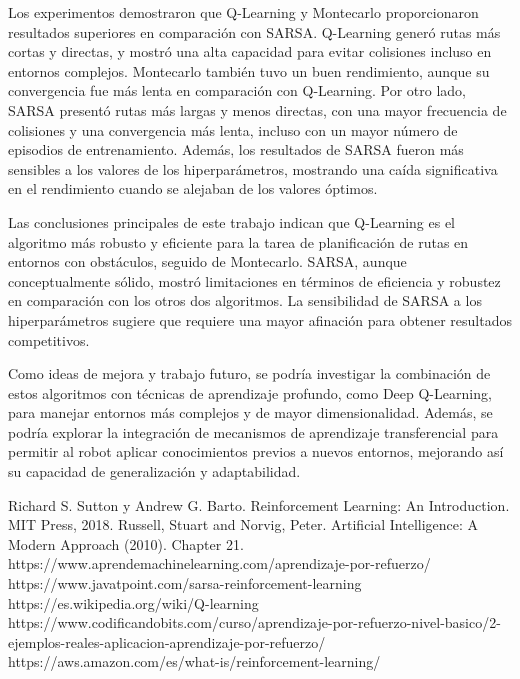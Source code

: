 \documentclass[conference,a4paper]{IEEEtran}
\begin{document}
Los experimentos demostraron que Q-Learning y Montecarlo proporcionaron resultados superiores en comparación con SARSA. Q-Learning generó rutas más cortas y directas, y mostró una alta 
capacidad para evitar colisiones incluso en entornos complejos. Montecarlo también tuvo un buen rendimiento, aunque su convergencia fue más lenta en comparación con Q-Learning. Por otro lado,
SARSA presentó rutas más largas y menos directas, con una mayor frecuencia de colisiones y una convergencia más lenta, incluso con un mayor número de episodios de entrenamiento.
Además, los resultados de SARSA fueron más sensibles a los valores de los hiperparámetros, mostrando una caída significativa en el rendimiento cuando se alejaban de los valores óptimos.\newline

Las conclusiones principales de este trabajo indican que Q-Learning es el algoritmo más robusto y eficiente para la tarea de planificación de rutas en entornos con obstáculos, seguido de Montecarlo. 
SARSA, aunque conceptualmente sólido, mostró limitaciones en términos de eficiencia y robustez en comparación con los otros dos algoritmos. La sensibilidad de SARSA a los hiperparámetros sugiere que 
requiere una mayor afinación para obtener resultados competitivos.\newline

Como ideas de mejora y trabajo futuro, se podría investigar la combinación de estos algoritmos con técnicas de aprendizaje profundo, como Deep Q-Learning, para manejar entornos más complejos y
de mayor dimensionalidad. Además, se podría explorar la integración de mecanismos de aprendizaje transferencial para permitir al robot aplicar conocimientos previos a nuevos entornos, mejorando
así su capacidad de generalización y adaptabilidad.

  \begin{thebibliography}{99}
   Richard S. Sutton y Andrew G. Barto. Reinforcement Learning: An Introduction.
  MIT Press, 2018.
    Russell, Stuart and Norvig, Peter. Artificial Intelligence: A Modern Approach
  (2010). Chapter 21.
   https://www.aprendemachinelearning.com/aprendizaje-por-refuerzo/
   https://www.javatpoint.com/sarsa-reinforcement-learning
   https://es.wikipedia.org/wiki/Q-learning
   https://www.codificandobits.com/curso/aprendizaje-por-refuerzo-nivel-basico/2-ejemplos-reales-aplicacion-aprendizaje-por-refuerzo/
   https://aws.amazon.com/es/what-is/reinforcement-learning/

  \end{thebibliography}


  
\end{document}
